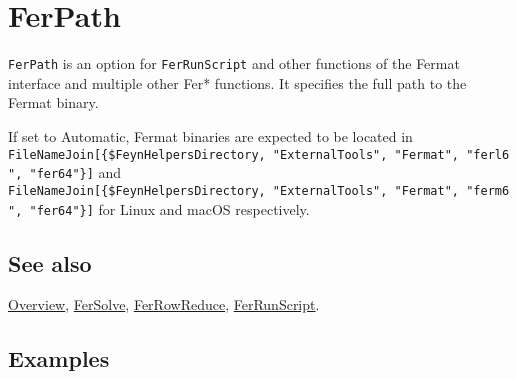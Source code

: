 \documentclass[../FeynHelpersManual.tex]{subfiles}
\begin{document}
\hypertarget{ferpath}{
\section{FerPath}\label{ferpath}}

\texttt{FerPath} is an option for \texttt{FerRunScript} and other
functions of the Fermat interface and multiple other Fer* functions. It
specifies the full path to the Fermat binary.

If set to Automatic, Fermat binaries are expected to be located in
\texttt{FileNameJoin[\allowbreak{}\{\allowbreak{}\$FeynHelpersDirectory,\ \allowbreak{}"ExternalTools",\ \allowbreak{}"Fermat",\ \allowbreak{}"ferl6",\ \allowbreak{}"fer64"\}]}
and
\texttt{FileNameJoin[\allowbreak{}\{\allowbreak{}\$FeynHelpersDirectory,\ \allowbreak{}"ExternalTools",\ \allowbreak{}"Fermat",\ \allowbreak{}"ferm6",\ \allowbreak{}"fer64"\}]}
for Linux and macOS respectively.

\subsection{See also}

\hyperlink{toc}{Overview}, \hyperlink{fersolve}{FerSolve},
\hyperlink{ferrowreduce}{FerRowReduce},
\hyperlink{ferrunscript}{FerRunScript}.

\subsection{Examples}
\end{document}
